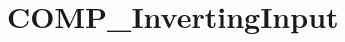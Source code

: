 \hypertarget{group___c_o_m_p___inverting_input}{\section{C\-O\-M\-P\-\_\-\-Inverting\-Input}
\label{group___c_o_m_p___inverting_input}
}
